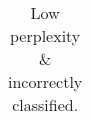 \begin{table}[H]
\begin{subtable}{0.5\linewidth}
{\begin{tabular}{r l}
    \hline
    \end{tabular}}
    \caption{Low perplexity \& incorrectly classified.}\label{subtab:ctg_case_examples_low_ppl_incorrect}
    \end{subtable}%
    

\end{table}
